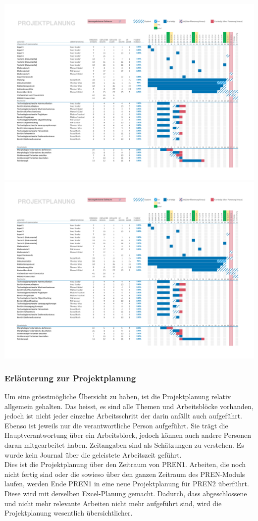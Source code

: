\begin{landscape}
    \includegraphics[page=1,scale=0.8,clip,trim=15mm 22mm 13mm 18mm] {Enddokumentation/Projektplanung_Management/Bilder/Projekt-Planung_Team32.pdf}
    \newpage
    \includegraphics[page=2,scale=0.8,clip,trim=15mm 100mm 13mm 10mm] {Enddokumentation/Projektplanung_Management/Bilder/Projekt-Planung_Team32.pdf}
    \newpage
\end{landscape}
\subsubsection{Erläuterung zur Projektplanung}
Um eine grösstmögliche Übersicht zu haben, ist die Projektplanung relativ allgemein gehalten. Das heisst, es sind alle Themen und Arbeitsblöcke vorhanden, jedoch ist nicht jeder einzelne Arbeitsschritt der darin anfällt auch aufgeführt. Ebenso ist jeweils nur die verantwortliche Person aufgeführt. Sie trägt die Hauptverantwortung über ein Arbeitsblock, jedoch können auch andere Personen daran mitgearbeitet haben. Zeitangaben sind als Schätzungen zu verstehen. Es wurde kein Journal über die geleistete Arbeitszeit geführt.\\
Dies ist die Projektplanung über den Zeitraum von PREN1. Arbeiten, die noch nicht fertig sind oder die sowieso über den ganzen Zeitraum des PREN-Moduls laufen, werden Ende PREN1 in eine neue Projektplanung für PREN2 überführt. Diese wird mit derselben Excel-Planung gemacht. Dadurch, dass abgeschlossene und nicht mehr relevante Arbeiten nicht mehr aufgeführt sind, wird die Projektplanung wesentlich übersichtlicher.  
